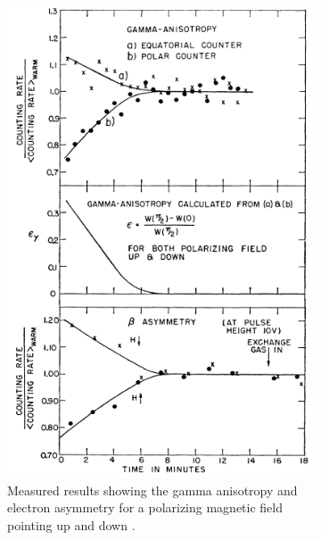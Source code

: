 \begin{figure}
\begin{subfigure}[b]{.39\linewidth}
        \includegraphics[width=\linewidth]{figs/resultsWu.png}
        \caption{Measured results showing the gamma anisotropy and electron asymmetry for a polarizing magnetic field pointing up and down \cite{PhysRev.105.1413}.}
        \label{fig:resultsWu}
    \end{subfigure}
    \label{fig:picsWu}
    \caption{}
\end{figure}